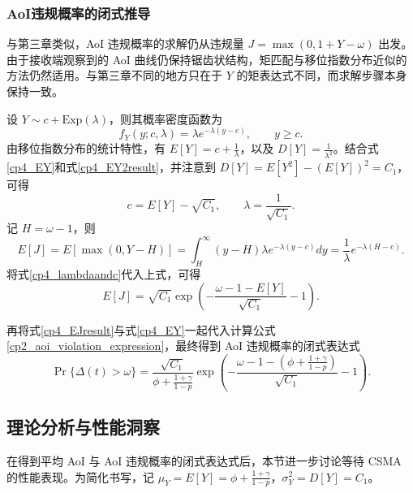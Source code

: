 \subsubsection{AoI违规概率的闭式推导}

与第三章类似，AoI 违规概率的求解仍从违规量 $J=\max(0,1+Y-\omega)$ 出发。由于接收端观察到的 AoI 曲线仍保持锯齿状结构，矩匹配与移位指数分布近似的方法仍然适用。与第三章不同的地方只在于 $Y$ 的矩表达式不同，而求解步骤本身保持一致。

设 $Y\sim c+\mathrm{Exp}(\lambda)$，则其概率密度函数为
\begin{equation}
    f_Y(y;c,\lambda)=\lambda e^{-\lambda(y-c)},\qquad y\ge c.
\end{equation}
由移位指数分布的统计特性，有 $E[Y] = c + \frac{1}{\lambda}$，以及 $D[Y] = \frac{1}{\lambda^2}$。结合式\eqref{cp4_EY}和式\eqref{cp4_EY2result}，并注意到 $D[Y] = E[Y^2] - (E[Y])^2 = C_1$，可得
\begin{equation}\label{cp4_lambdaandc}
    c = E[Y]-\sqrt{C_1},\qquad \lambda=\frac{1}{\sqrt{C_1}}.
\end{equation}
记 $H=\omega-1$，则
\begin{equation}
        E[J] = E[\max(0,Y-H)] = \int_H^\infty (y-H)\lambda e^{-\lambda(y-c)}dy = \frac{1}{\lambda}e^{-\lambda(H-c)}.
\end{equation}
将式\eqref{cp4_lambdaandc}代入上式，可得
\begin{equation}\label{cp4_EJresult}
    E[J] = \sqrt{C_1}\exp\left(-\frac{\omega-1-E[Y]}{\sqrt{C_1}}-1\right).
\end{equation}

再将式\eqref{cp4_EJresult}与式\eqref{cp4_EY}一起代入计算公式\eqref{cp2_aoi_violation_expression}，最终得到 AoI 违规概率的闭式表达式
\begin{equation}\label{cp4_violation_prob_simplified}
    \Pr\{\Delta(t)>\omega\}=
    \frac{\sqrt{C_1}}{\phi + \frac{1+\gamma}{1-p}}
    \exp\left(
    -\frac{\omega-1-\left(\phi + \frac{1+\gamma}{1-p}\right)}{\sqrt{C_1}}
    -1
    \right).
\end{equation}

\subsection{理论分析与性能洞察}

在得到平均 AoI 与 AoI 违规概率的闭式表达式后，本节进一步讨论等待 CSMA 的性能表现。为简化书写，记 $\mu_Y = E[Y] = \phi + \frac{1+\gamma}{1-p}$，$\sigma_Y^2 = D[Y] = C_1$。

